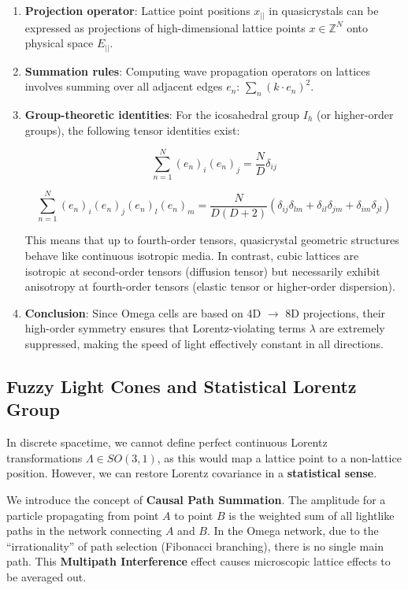 \begin{enumerate}
\item \textbf{Projection operator}: Lattice point positions $x_{||}$ in quasicrystals can be expressed as projections of high-dimensional lattice points $x \in \mathbb{Z}^N$ onto physical space $E_{||}$.
\item \textbf{Summation rules}: Computing wave propagation operators on lattices involves summing over all adjacent edges $e_n$: $\sum_n (k \cdot e_n)^2$.
\item \textbf{Group-theoretic identities}: For the icosahedral group $I_h$ (or higher-order groups), the following tensor identities exist:

\[\sum_{n=1}^N (e_n)_i (e_n)_j = \frac{N}{D} \delta_{ij}\]

\[\sum_{n=1}^N (e_n)_i (e_n)_j (e_n)_l (e_n)_m = \frac{N}{D(D+2)} (\delta_{ij}\delta_{lm} + \delta_{il}\delta_{jm} + \delta_{im}\delta_{jl})\]

This means that up to fourth-order tensors, quasicrystal geometric structures behave like continuous isotropic media. In contrast, cubic lattices are isotropic at second-order tensors (diffusion tensor) but necessarily exhibit anisotropy at fourth-order tensors (elastic tensor or higher-order dispersion).
\item \textbf{Conclusion}: Since Omega cells are based on 4D $\to$ 8D projections, their high-order symmetry ensures that Lorentz-violating terms $\lambda$ are extremely suppressed, making the speed of light effectively constant in all directions.
\end{enumerate}

\subsection{Fuzzy Light Cones and Statistical Lorentz Group}

In discrete spacetime, we cannot define perfect continuous Lorentz transformations $\Lambda \in SO(3,1)$, as this would map a lattice point to a non-lattice position. However, we can restore Lorentz covariance in a \textbf{statistical sense}.

We introduce the concept of \textbf{Causal Path Summation}. The amplitude for a particle propagating from point $A$ to point $B$ is the weighted sum of all lightlike paths in the network connecting $A$ and $B$.
In the Omega network, due to the ``irrationality'' of path selection (Fibonacci branching), there is no single main path. This \textbf{Multipath Interference} effect causes microscopic lattice effects to be averaged out.

